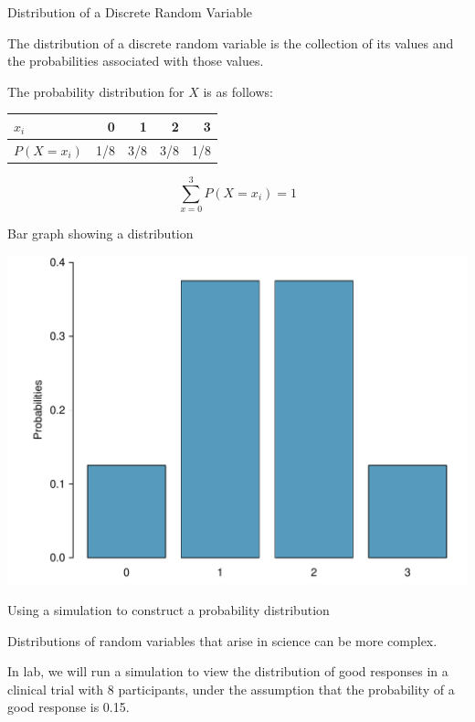 \documentclass[ignorenonframetext,aspectratio=169]{beamer}
\begin{document}
\begin{frame}{Distribution of a Discrete Random Variable}

The distribution of a discrete random variable is the collection of its
values and the probabilities associated with those values.

The probability distribution for \(X\) is as follows:

\centering

\begin{tabular}{l | rrrr }
        $x_i$ & 0 & 1 & 2 & 3 \\
        \hline
        $P(X = x_i)$ & 1/8 & 3/8 & 3/8 & 1/8 \\
    \end{tabular}

\[\sum_{x=0}^3 P(X = x_i) = 1 \]

\end{frame}

\begin{frame}{Bar graph showing a distribution}

\includegraphics{figures/barPlotCoinTossing.pdf}

\end{frame}

\begin{frame}{Using a simulation to construct a probability
distribution}

Distributions of random variables that arise in science can be more
complex.

In lab, we will run a simulation to view the distribution of good
responses in a clinical trial with 8 participants, under the assumption
that the probability of a good response is 0.15.

\end{frame}
\end{document}

